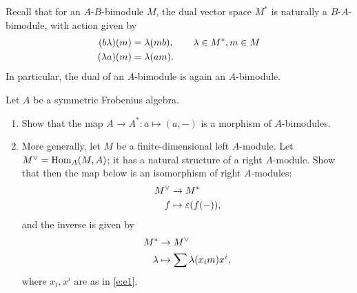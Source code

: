 \begin{exercise}\label{ec:dual-module-frob}
  Recall that for an $A$-$B$-bimodule $M$, the dual vector space $M^*$
  is naturally a $B$-$A$-bimodule, with action given by
  \begin{align*}
    (b\lambda) (m) & = \lambda (mb),\qquad \lambda\in M^*, m\in M\\
    (\lambda a) (m) &= \lambda (am).
  \end{align*}
  In particular, the dual of an $A$-bimodule is again an $A$-bimodule.

  Let $A$ be a symmetric Frobenius algebra.
  \begin{enumerate}
    \item
      Show that the map $A\to A^*\colon a\mapsto (a, -)$ is a morphism of
      $A$-bimodules.
    \item
      More generally, let $M$ be a finite-dimensional left $A$-module. Let
      $M^\vee =\operatorname{Hom}_A(M, A)$; it has a natural structure of a right
      $A$-module. Show that then the map below is an isomorphism of right
      $A$-modules: %
      \begin{align*}
        M^\vee &\to M^*\\
        f&\mapsto \varepsilon(f(-)),
      \end{align*}
      and the inverse is given by
      \begin{align*}
        M^* &\to M^\vee\\
        \lambda&\mapsto \sum \lambda(x_im)x^i,
      \end{align*}
      where $x_i, x^i$ are as in \eqref{e:e1}.
  \end{enumerate}
\end{exercise}
\clearpage

